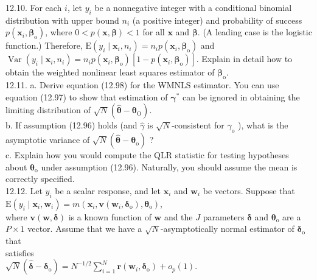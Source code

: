 \documentclass[10pt]{article}
\begin{document}
12.10. For each $i$, let $y_{i}$ be a nonnegative integer with a conditional binomial distribution with upper bound $n_{i}$ (a positive integer) and probability of success $p\left(\mathbf{x}_{i}, \boldsymbol{\beta}_{\mathrm{o}}\right)$, where $0<p(\mathbf{x}, \boldsymbol{\beta})<1$ for all $\mathbf{x}$ and $\boldsymbol{\beta}$. (A leading case is the logistic function.) Therefore, $\mathrm{E}\left(y_{i} \mid \mathbf{x}_{i}, n_{i}\right)=n_{i} p\left(\mathbf{x}_{i}, \boldsymbol{\beta}_{\mathrm{o}}\right)$ and $\operatorname{Var}\left(y_{i} \mid \mathbf{x}_{i}, n_{i}\right)=n_{i} p\left(\mathbf{x}_{i}, \boldsymbol{\beta}_{\mathrm{o}}\right)\left[1-p\left(\mathbf{x}_{i}, \boldsymbol{\beta}_{\mathrm{o}}\right)\right]$. Explain in detail how to obtain the weighted nonlinear least squares estimator of $\boldsymbol{\beta}_{\mathrm{o}}$.\\
12.11. a. Derive equation (12.98) for the WMNLS estimator. You can use equation (12.97) to show that estimation of $\boldsymbol{\gamma}^{*}$ can be ignored in obtaining the limiting distribution of $\sqrt{N}\left(\hat{\boldsymbol{\theta}}-\boldsymbol{\theta}_{\mathrm{O}}\right)$.\\
b. If assumption (12.96) holds (and $\hat{\gamma}$ is $\sqrt{N}$-consistent for $\gamma_{\mathrm{o}}$ ), what is the asymptotic variance of $\sqrt{N}\left(\hat{\boldsymbol{\theta}}-\boldsymbol{\theta}_{\mathrm{o}}\right)$ ?\\
c. Explain how you would compute the QLR statistic for testing hypotheses about $\boldsymbol{\theta}_{\mathrm{o}}$ under assumption (12.96). Naturally, you should assume the mean is correctly specified.\\
12.12. Let $y_{i}$ be a scalar response, and let $\mathbf{x}_{i}$ and $\mathbf{w}_{i}$ be vectors. Suppose that\\
$\mathrm{E}\left(y_{i} \mid \mathbf{x}_{i}, \mathbf{w}_{i}\right)=m\left(\mathbf{x}_{i}, \mathbf{v}\left(\mathbf{w}_{i}, \boldsymbol{\delta}_{\mathrm{o}}\right), \boldsymbol{\theta}_{\mathrm{o}}\right)$,\\
where $\mathbf{v}(\mathbf{w}, \boldsymbol{\delta})$ is a known function of $\mathbf{w}$ and the $J$ parameters $\boldsymbol{\delta}$ and $\boldsymbol{\theta}_{\mathrm{o}}$ are a $P \times 1$ vector. Assume that we have a $\sqrt{N}$-asymptotically normal estimator of $\boldsymbol{\delta}_{\mathrm{o}}$ that\\
satisfies\\
$\sqrt{N}\left(\hat{\boldsymbol{\delta}}-\boldsymbol{\delta}_{\mathrm{o}}\right)=N^{-1 / 2} \sum_{i=1}^{N} \mathbf{r}\left(\mathbf{w}_{i}, \boldsymbol{\delta}_{\mathrm{o}}\right)+o_{p}(1)$.\\
\end{document}
